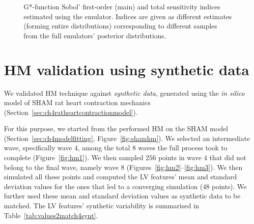\begin{figure}[ht!]
    \myfloatalign
    \quad
    \caption{G*-function Sobol' first-order (main) and total sensitivity indices estimated using the emulator. Indices are given as different estimates (forming entire distributions) corresponding to different samples from the full emulators' posterior distributions.}
    \label{fig:gstar_emulator_estimates}
\end{figure}


%
%
%
\cleardoublepage
\section{HM validation using synthetic data}\label{sec:chAHM_validation_using_synthetic_data}
We validated HM technique against \textit{synthetic data}, generated using the \textit{in silico} model of SHAM rat heart contraction mechanics (Section~\ref{sec:ch4ratheartcontractionmodel}).

\vspace{0.2cm}
For this purpose, we started from the performed HM on the SHAM model (Section~\ref{sec:ch4modelfitting}, Figure~\ref{fig:shamhm}). We selected an intermediate wave, specifically wave $4$, among the total $8$ waves the full process took to complete (Figure~\ref{fig:hm1}). We then sampled $256$ points in wave $4$ that did not belong to the final wave, namely wave $8$ (Figures~\ref{fig:hm2}--\ref{fig:hm3}). We then simulated all these points and computed the LV features' mean and standard deviation values for the ones that led to a converging simulation ($48$ points). We further used these mean and standard deviation values as synthetic data to be matched. The LV features' synthetic variability is summarised in Table~\ref{tab:values2match4synt}.

